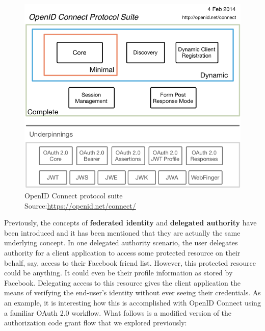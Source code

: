 \begin{figure}
    \centering
    \includegraphics[scale=2.0]{chapters/images/chp3/OpenIDC-map.png}
    \caption[OpenID Connect protocol suite]{OpenID Connect protocol suite\\\hspace{\textwidth}Source:\hspace{0.2cm}\url{https://openid.net/connect/}}
    \label{fig:oidc}
\end{figure}

Previously, the concepts of \textbf{federated identity} and \textbf{delegated authority} have been introduced and it has been mentioned that they are actually the same underlying concept. In one delegated authority scenario, the user delegates authority for a client application to access some protected resource on their behalf, say, access to their Facebook friend list. However, this protected resource could be anything. It could even be their profile information as stored by Facebook. Delegating access to this resource gives the client application the means of verifying the end-user's identity without ever seeing their credentials. As an example, it is interesting how this is accomplished with OpenID Connect using a familiar OAuth 2.0 workflow. What follows is a modified version of the authorization code grant flow that we explored previously:

